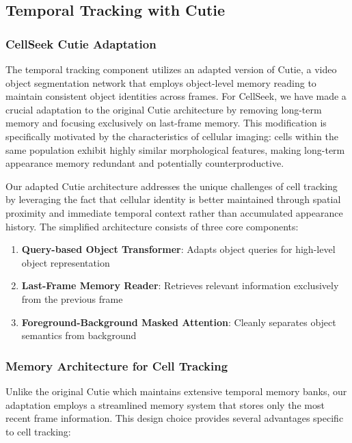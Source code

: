 \documentclass[12pt]{article}
\begin{document}
\subsection{Temporal Tracking with Cutie}

\subsubsection{CellSeek Cutie Adaptation}

The temporal tracking component utilizes an adapted version of Cutie, a video object segmentation network that employs object-level memory reading to maintain consistent object identities across frames. For CellSeek, we have made a crucial adaptation to the original Cutie architecture by removing long-term memory and focusing exclusively on last-frame memory. This modification is specifically motivated by the characteristics of cellular imaging: cells within the same population exhibit highly similar morphological features, making long-term appearance memory redundant and potentially counterproductive.

Our adapted Cutie architecture addresses the unique challenges of cell tracking by leveraging the fact that cellular identity is better maintained through spatial proximity and immediate temporal context rather than accumulated appearance history. The simplified architecture consists of three core components:

\begin{enumerate}
  \item \textbf{Query-based Object Transformer}: Adapts object queries for high-level object representation
  \item \textbf{Last-Frame Memory Reader}: Retrieves relevant information exclusively from the previous frame
  \item \textbf{Foreground-Background Masked Attention}: Cleanly separates object semantics from background
\end{enumerate}

\subsubsection{Memory Architecture for Cell Tracking}

Unlike the original Cutie which maintains extensive temporal memory banks, our adaptation employs a streamlined memory system that stores only the most recent frame information. This design choice provides several advantages specific to cell tracking:
\end{document}
